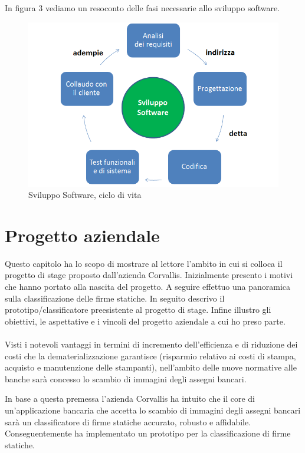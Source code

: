 In figura 3 vediamo un resoconto delle fasi necessarie allo sviluppo software.
\begin{figure}[H]
\centering
\includegraphics[scale=0.55]{../Logo&Header/sviluppoSoftware.png}
\caption{ Sviluppo Software, ciclo di vita}
\end{figure}

\newpage
\newpage

\section{Progetto aziendale}
\label{2.0}
Questo capitolo ha lo scopo di mostrare al lettore l'ambito in cui si colloca il progetto di stage proposto dall'azienda Corvallis. Inizialmente presento i motivi che hanno portato alla nascita del progetto. A seguire effettuo una panoramica sulla classificazione delle firme statiche. In seguito descrivo il prototipo/classificatore preesistente al progetto di stage. Infine illustro gli obiettivi, le aspettative e i vincoli del progetto aziendale a cui ho preso parte.\\\\
Visti i notevoli vantaggi in termini di incremento dell'efficienza e di riduzione dei costi che la \gls{dematerializzazione} garantisce (risparmio relativo ai costi di stampa, acquisto e manutenzione delle stampanti), nell'ambito delle nuove normative alle banche sarà concesso lo scambio di immagini degli assegni bancari. 

In base a questa premessa l'azienda Corvallis ha intuito che il core di un'applicazione bancaria che accetta lo scambio di immagini degli assegni bancari sarà un classificatore di firme statiche accurato, robusto e affidabile. Conseguentemente ha implementato un prototipo per la classificazione di firme statiche.

